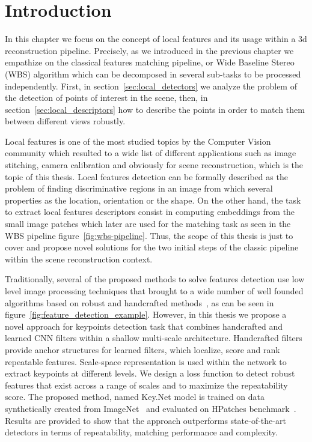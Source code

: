\section{Introduction}

In this chapter we focus on the concept of local features and its usage within a 3d reconstruction pipeline. Precisely, as we introduced in the previous chapter we empathize on the classical features matching pipeline, or Wide Baseline Stereo (WBS) algorithm which can be decomposed in several sub-tasks to be processed independently. First, in section~\ref{sec:local_detectors} we analyze the problem of the detection of points of interest in the scene, then, in section~\ref{sec:local_descriptors} how to describe the points in order to match them between different views robustly.

Local features is one of the most studied topics by the Computer Vision community which resulted to a wide list of different applications such as image stitching, camera calibration and obviously for scene reconstruction, which is the topic of this thesis. Local features detection can be formally described as the problem of finding discriminative regions in an image from which several properties as the location, orientation or the shape. On the other hand, the task to extract local features descriptors consist in computing embeddings from the small image patches which later are used for the matching task as seen in the WBS pipeline figure~\ref{fig:wbs-pipeline}. Thus, the scope of this thesis is just to cover and propose novel solutions for the two initial steps of the classic pipeline within the scene reconstruction context.

Traditionally, several of the proposed methods to solve features detection use low level image processing techniques that brought to a wide number of well founded algorithms based on robust and handcrafted methods~\cite{SIFT, ORB}, as can be seen in figure~\ref{fig:feature_detection_example}. However, in this thesis we propose a novel approach for keypoints detection task that combines handcrafted and learned CNN filters within a shallow multi-scale architecture. Handcrafted filters provide anchor structures for learned filters, which localize, score and rank repeatable features. Scale-space representation is used within the network to extract keypoints at different levels. We design a loss function to detect robust features that exist across a range of scales and to maximize the repeatability score. The proposed method, named Key.Net model is trained on data synthetically created from ImageNet~\cite{AlexNet2012} and evaluated on HPatches benchmark~\cite{HPatches}. Results are provided to show that the approach outperforms state-of-the-art detectors in terms of repeatability, matching performance and complexity.

